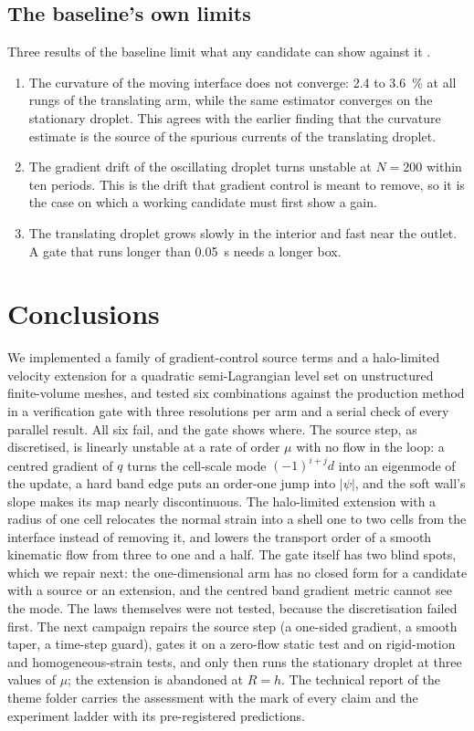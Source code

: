 \documentclass[preprint,3p,11pt]{elsarticle}
\newcommand{\psilev}{\psi}
\begin{document}
\subsection{The baseline's own limits}
Three results of the baseline limit what any candidate can show against it
\cite{maric2026sl}.
\begin{enumerate}
  \item The curvature of the moving interface does not converge: \SI{2.4}{} to
  \SI{3.6}{\percent} at all rungs of the translating arm, while the same estimator
  converges on the stationary droplet. This agrees with the earlier finding that the
  curvature estimate is the source of the spurious currents of the translating droplet.
  \item The gradient drift of the oscillating droplet turns unstable at $N=200$ within ten
  periods. This is the drift that gradient control is meant to remove, so it is the case
  on which a working candidate must first show a gain.
  \item The translating droplet grows slowly in the interior and fast near the outlet.
  A gate that runs longer than \SI{0.05}{s} needs a longer box.
\end{enumerate}

\section{Conclusions}
\label{sec:conclusions}

We implemented a family of gradient-control source terms and a halo-limited velocity
extension for a quadratic semi-Lagrangian level set on unstructured finite-volume meshes,
and tested six combinations against the production method in a verification gate with
three resolutions per arm and a serial check of every parallel result. All six fail, and
the gate shows where. The source step, as discretised, is linearly unstable at a rate of
order $\mu$ with no flow in the loop: a centred gradient of $q$ turns the cell-scale mode
$(-1)^{i+j}d$ into an eigenmode of the update, a hard band edge puts an order-one jump into
$|\psilev|$, and the soft wall's slope makes its map nearly discontinuous. The
halo-limited extension with a radius of one cell relocates the normal strain into a shell
one to two cells from the interface instead of removing it, and lowers the transport order
of a smooth kinematic flow from three to one and a half. The gate itself has two blind
spots, which we repair next: the one-dimensional arm has no closed form for a candidate
with a source or an extension, and the centred band gradient metric cannot see the mode.
The laws themselves were not tested, because the discretisation failed first. The next
campaign repairs the source step (a one-sided gradient, a smooth taper, a time-step
guard), gates it on a zero-flow static test and on rigid-motion and homogeneous-strain
tests, and only then runs the stationary droplet at three values of $\mu$; the extension
is abandoned at $R=h$. The technical report of the theme folder carries the assessment
with the mark of every claim and the experiment ladder with its pre-registered
predictions.
\end{document}
